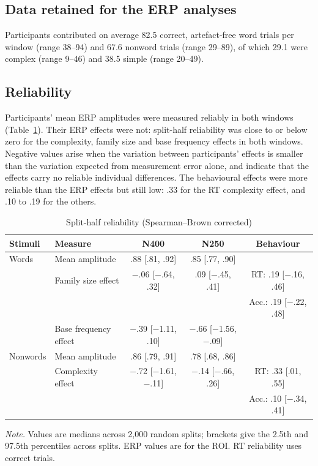 \subsection{Data retained for the ERP analyses}
Participants contributed on average 82.5 correct, artefact-free word trials per
window (range 38--94) and 67.6 nonword trials (range 29--89), of which 29.1
were complex (range 9--46) and 38.5 simple (range 20--49).

\subsection{Reliability}
Participants' mean ERP amplitudes were measured reliably in both windows
(Table~\ref{tab:reliability}). Their ERP effects were not: split-half
reliability was close to or below zero for the complexity, family size and base
frequency effects in both windows. Negative values arise when the variation
between participants' effects is smaller than the variation expected from
measurement error alone, and indicate that the effects carry no reliable
individual differences. The behavioural effects were more reliable than the ERP
effects but still low: .33 for the RT complexity effect, and .10 to .19 for the
others.

\begin{table}[htbp]
\centering
\caption{Split-half reliability (Spearman--Brown corrected)}
\label{tab:reliability}
\begin{tabular}{llccc}
\toprule
Stimuli & Measure & N400 & N250 & Behaviour \\
\midrule
Words    & Mean amplitude        & .88 [.81, .92]          & .85 [.77, .90]          & \\
         & Family size effect    & $-$.06 [$-$.64, .32]    & .09 [$-$.45, .41]       & RT: .19 [$-$.16, .46] \\
         &                       &                         &                         & Acc.: .19 [$-$.22, .48] \\
         & Base frequency effect & $-$.39 [$-$1.11, .10]   & $-$.66 [$-$1.56, $-$.09] & \\
Nonwords & Mean amplitude        & .86 [.79, .91]          & .78 [.68, .86]          & \\
         & Complexity effect     & $-$.72 [$-$1.61, $-$.11] & $-$.14 [$-$.66, .26]    & RT: .33 [.01, .55] \\
         &                       &                         &                         & Acc.: .10 [$-$.34, .41] \\
\bottomrule
\end{tabular}

\vspace{2pt}
\begin{minipage}{0.9\linewidth}\footnotesize
\textit{Note.} Values are medians across 2,000 random splits; brackets give the
2.5th and 97.5th percentiles across splits. ERP values are for the ROI. RT
reliability uses correct trials.
\end{minipage}
\end{table}

